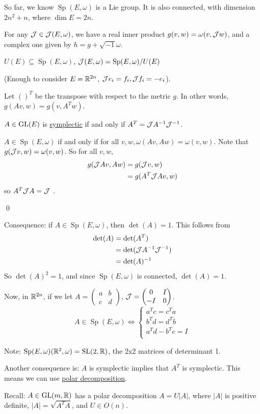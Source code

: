 \documentclass[x11names,reqno,14pt]{extarticle}
\newcommand{\pmat}[4]{\begin{pmatrix} #1 & #2 \\ #3 & #4 \end{pmatrix}}
\newcommand{\spew}{\Sp(E,\omega)}
\newcommand{\jew}{\mc{J}(E,\omega)}
\DeclareMathOperator{\Sp}{Sp}
\begin{document}
So far, we know $\spew$ is a Lie group. It is also connected, with dimension $2n^2 + n$, where $\dim E = 2n$. 

For any $\mc{J}\in\jew$, we have a real inner product $g(v, w) = \omega(v, \mathcal{J}w)$, and a complex one given by $h = g + \sqrt{-1}\omega$. 

$U(E) \subseteq \spew$, $\jew=\spew/U(E)$

(Enough to consider $E = \mathbb{R}^{2n}$, $\mathcal{J}e_i = f_i, \mathcal{J}f_i = -e_i$). 

Let $()^T$ be the transpose with respect to the metric $g$. In other words, $g(Av, w) = g(v, A^Tw)$. 

\prop

$A \in {\mathrm{GL}}(E)$ is \underline{symplectic} if and only if $A^T = \mathcal{J}A^{-1}\mathcal{J}^{-1}$. 

\proof

$A\in\spew$ if and only if for all $v, w, \omega(Av,Aw) = \omega(v, w)$. Note that $g(\mathcal{J}v,w) = \omega(v, w)$. So for all $v, w$, 
\begin{align*}
g(\mathcal{J}Av, Aw) & = g(\mathcal{J}v, w) \\
& = g(A^T\mathcal{J} Av, w) 
\end{align*}
so $A^T\mathcal{J}A = \mathcal{J}$ .

\qed

Consequence: if $A\in\spew$, then $\det(A) = 1$. This follows from 
\begin{align*}
\det(A) & = \det(A^T) \\
& = \det(\mathcal{J}A^{-1}\mathcal{J}^{-1}) \\
& = \det(A)^{-1} 
\end{align*}
So $\det(A)^2 = 1$, and since $\spew$ is connected, $\det(A) = 1$. 

Now, in $\mathbb{R}^{2n}$, if we let $A = \pmat{a}{b}{c}{d}$, $\mc{J} = \pmat{0}{I}{-I}{0}$.
\[
A \in \spew \iff \begin{cases} a^Tc = c^Ta \\ b^Td = d^Tb \\ a^Td - b^Tc = I \\ \end{cases}
\]

Note: $\spew(\R^2, \omega) = \SL(2,\R)$, the 2x2 matrices of determinant 1. 

Another consequence is: $A$ is symplectic implies that $A^T$ is symplectic. This means we can use \underline{polar decomposition}. 

Recall: $A \in {\mathrm{GL}}(m, \mathbb{R})$ has a polar decomposition $A = U|A|$, where $|A|$ is positive definite, $|A| = \sqrt{A^TA}$, and $U \in O(n)$. 
\end{document}
